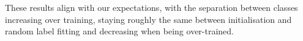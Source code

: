 \documentclass{article}
\begin{document}
                These results align with our expectations, with the separation between classes increasing over training, staying roughly the same between initialisation and random label fitting and decreasing when being over-trained.
                
\end{document}
